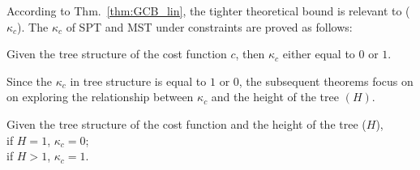 According to Thm.~\ref{thm:GCB_lin}, the tighter theoretical bound is relevant to ($\kappa_c$).
The $\kappa_c$ of SPT and MST under constraints are proved as follows:

\begin{theorem} 
{Given the tree structure of the cost function $c$, then $\kappa_c$ either equal to $0$ or $1$.
}
\label{thm:kappa}
\end{theorem}



%

Since the $\kappa_c$ in tree structure is equal to $1$ or $0$,
the subsequent theorems focus on on exploring the relationship between $\kappa_c$ and the height of the tree $(H)$.

\begin{theorem}
Given the tree structure of the cost function and the height of the tree ($H$), \\
if $H=1$, $\kappa_c = 0$;\\
if $H>1$, $\kappa_c = 1$.
\label{thm:kappac}
\end{theorem}

